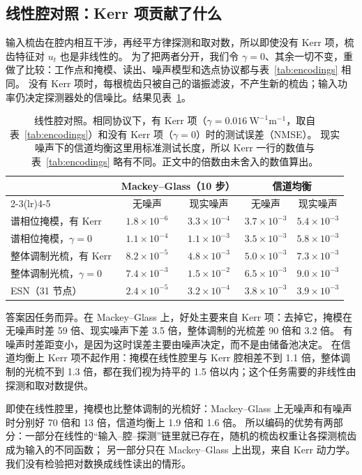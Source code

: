 \subsection{线性腔对照：Kerr 项贡献了什么}\label{sec:linear}

输入梳齿在腔内相互干涉，再经平方律探测和取对数，所以即使没有 Kerr 项，梳齿特征对 $u_t$ 也是非线性的。
为了把两者分开，我们令 $\gamma=0$、其余一切不变，重做了比较：工作点和掩模、读出、噪声模型和选点协议都与表~\ref{tab:encodings} 相同。
没有 Kerr 项时，每根梳齿只被自己的谐振滤波，不产生新的梳齿；输入功率仍决定探测器处的信噪比。结果见表~\ref{tab:linear}。

\begin{table}[htbp]
\centering
\caption{线性腔对照。相同协议下，有 Kerr 项（$\gamma=0.016~\mathrm{W^{-1}m^{-1}}$，取自表~\ref{tab:encodings}）和没有 Kerr 项（$\gamma=0$）时的测试误差（NMSE）。
现实噪声下的信道均衡这里用标准测试长度，所以 Kerr 一行的数值与表~\ref{tab:encodings} 略有不同。正文中的倍数由未舍入的数值算出。}
\label{tab:linear}
\small
\begin{tabular}{lcccc}
\toprule
 & \multicolumn{2}{c}{Mackey--Glass（10 步）} & \multicolumn{2}{c}{信道均衡} \\
\cmidrule(lr){2-3}\cmidrule(lr){4-5}
 & 无噪声 & 现实噪声 & 无噪声 & 现实噪声 \\
\midrule
谱相位掩模，有 Kerr & $1.8\times10^{-6}$ & $3.3\times10^{-4}$ & $3.7\times10^{-3}$ & $5.4\times10^{-3}$ \\
谱相位掩模，$\gamma=0$ & $1.1\times10^{-4}$ & $1.1\times10^{-3}$ & $3.5\times10^{-3}$ & $5.8\times10^{-3}$ \\
整体调制光梳，有 Kerr & $8.2\times10^{-5}$ & $4.8\times10^{-3}$ & $5.0\times10^{-3}$ & $7.3\times10^{-3}$ \\
整体调制光梳，$\gamma=0$ & $7.4\times10^{-3}$ & $1.5\times10^{-2}$ & $6.5\times10^{-3}$ & $9.0\times10^{-3}$ \\
\midrule
ESN（31 节点） & $2.4\times10^{-5}$ & $3.2\times10^{-4}$ & $3.8\times10^{-3}$ & $3.9\times10^{-3}$ \\
\bottomrule
\end{tabular}
\end{table}

答案因任务而异。在 Mackey--Glass 上，好处主要来自 Kerr 项：去掉它，掩模在无噪声时差 59 倍、现实噪声下差 3.5 倍，整体调制的光梳差 90 倍和 3.2 倍。
有噪声时差距变小，是因为这时误差主要由噪声决定，而不是由储备池决定。
在信道均衡上 Kerr 项不起作用：掩模在线性腔里与 Kerr 腔相差不到 1.1 倍，整体调制的光梳不到 1.3 倍，都在我们视为持平的 1.5 倍以内；这个任务需要的非线性由探测和取对数提供。

即使在线性腔里，掩模也比整体调制的光梳好：Mackey--Glass 上无噪声和有噪声时分别好 70 倍和 13 倍，信道均衡上 1.9 倍和 1.6 倍。
所以编码的优势有两部分：一部分在线性的“输入--腔--探测”链里就已存在，随机的梳齿权重让各探测梳齿成为输入的不同函数；
另一部分只在 Mackey--Glass 上出现，来自 Kerr 动力学。我们没有检验把对数换成线性读出的情形。

